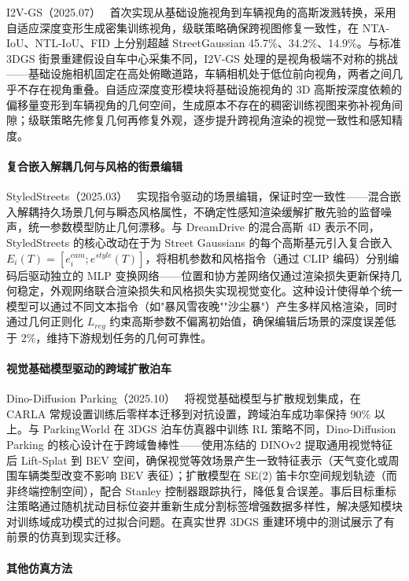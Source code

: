 I2V-GS（2025.07）~\cite{2507_23683} 首次实现从基础设施视角到车辆视角的高斯泼溅转换，采用自适应深度变形生成密集训练视角，级联策略确保跨视图修复一致性，在 NTA-IoU、NTL-IoU、FID 上分别超越 StreetGaussian 45.7\%、34.2\%、14.9\%。与标准 3DGS 街景重建假设自车中心采集不同，I2V-GS 处理的是视角极端不对称的挑战——基础设施相机固定在高处俯瞰道路，车辆相机处于低位前向视角，两者之间几乎不存在视角重叠。自适应深度变形模块将基础设施视角的 3D 高斯按深度依赖的偏移量变形到车辆视角的几何空间，生成原本不存在的稠密训练视图来弥补视角间隙；级联策略先修复几何再修复外观，逐步提升跨视角渲染的视觉一致性和感知精度。

\paragraph{复合嵌入解耦几何与风格的街景编辑}

StyledStreets（2025.03）~\cite{2503_21104} 实现指令驱动的场景编辑，保证时空一致性——混合嵌入解耦持久场景几何与瞬态风格属性，不确定性感知渲染缓解扩散先验的监督噪声，统一参数模型防止几何漂移。与 DreamDrive 的混合高斯 4D 表示不同，StyledStreets 的核心改动在于为 Street Gaussians 的每个高斯基元引入复合嵌入 $E_i(T) = [e_i^{cam}; e^{style}(T)]$，将相机参数和风格指令（通过 CLIP 编码）分别编码后驱动独立的 MLP 变换网络——位置和协方差网络仅通过渲染损失更新保持几何稳定，外观网络联合渲染损失和风格损失实现视觉变化。这种设计使得单个统一模型可以通过不同文本指令（如"暴风雪夜晚""沙尘暴"）产生多样风格渲染，同时通过几何正则化 $L_{reg}$ 约束高斯参数不偏离初始值，确保编辑后场景的深度误差低于 2\%，维持下游规划任务的几何可靠性。

\paragraph{视觉基础模型驱动的跨域扩散泊车}

Dino-Diffusion Parking（2025.10）~\cite{2510_20335} 将视觉基础模型与扩散规划集成，在 CARLA 常规设置训练后零样本迁移到对抗设置，跨域泊车成功率保持 90\% 以上。与 ParkingWorld 在 3DGS 泊车仿真器中训练 RL 策略不同，Dino-Diffusion Parking 的核心设计在于跨域鲁棒性——使用冻结的 DINOv2 提取通用视觉特征后 Lift-Splat 到 BEV 空间，确保视觉等效场景产生一致特征表示（天气变化或周围车辆类型改变不影响 BEV 表征）；扩散模型在 SE(2) 笛卡尔空间规划轨迹（而非终端控制空间），配合 Stanley 控制器跟踪执行，降低复合误差。事后目标重标注策略通过随机扰动目标位姿并重新生成分割标签增强数据多样性，解决感知模块对训练域成功模式的过拟合问题。在真实世界 3DGS 重建环境中的测试展示了有前景的仿真到现实迁移。

\paragraph{其他仿真方法}

